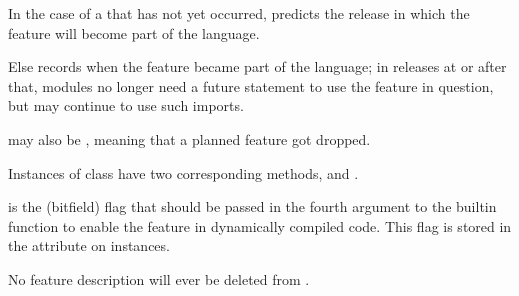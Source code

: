 In the case of a  that has not yet occurred,
 predicts the release in which the feature will
become part of the language.

Else  records when the feature became part of
the language; in releases at or after that, modules no longer need a
future statement to use the feature in question, but may continue to
use such imports.

 may also be , meaning that a planned
feature got dropped.

Instances of class  have two corresponding methods,
 and .

 is the (bitfield) flag that should be passed in the
fourth argument to the builtin function  to enable
the feature in dynamically compiled code.  This flag is stored in the
 attribute on  instances.

No feature description will ever be deleted from .
